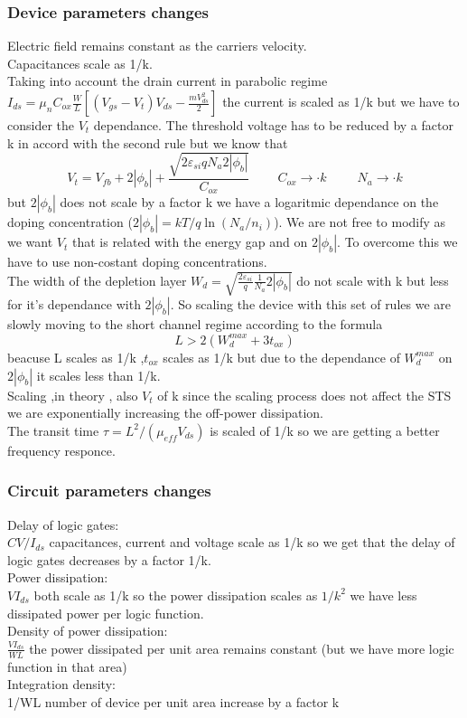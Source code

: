 \subsubsection{Device parameters changes}
Electric field remains constant as the carriers velocity.\\
Capacitances scale as 1/k.\\
Taking into account the drain current in parabolic regime $I_{ds}=\mu_nC_{ox}\frac{W}{L}[(V_{gs}-V_t)V_{ds}-\frac{mV_{ds}^2}{2}]$ the current is scaled as 1/k but we have to consider the $V_t$ dependance. The threshold voltage has to be reduced by a factor k in accord with the second rule but we know that 
\begin{equation}
V_t=V_{fb}+2|\phi_b|+\frac{\sqrt{2\varepsilon_{si}qN_a2|\phi_b|}}{C_{ox}} \ \ \ \ \ \ \ \ \ \ C_{ox}\rightarrow \cdot k \ \ \ \ \ \ \ \ \ \ \ N_a \rightarrow \cdot k
\end{equation}
but $2|\phi_b|$ does not scale by a factor k we have a logaritmic dependance on the doping concentration ($2|\phi_b|=kT/q\ln(N_a/n_i)$). We are not free to modify as we want $V_t$ that is related with the energy gap and on $2|\phi_b|$. To overcome this we have to use non-costant doping concentrations.\\
The width of the depletion layer $W_d=\sqrt{\frac{2\varepsilon_{si}}{q}\frac{1}{N_a}2|\phi_b|}$ do not scale with k but less for it's dependance with $2|\phi_b|$. So scaling the device with this set of rules we are slowly moving to the short channel regime according to the formula 
\begin{equation}
L>2(W_d^{max}+3t_{ox})
\end{equation}
beacuse L scales as 1/k ,$t_{ox}$ scales as 1/k but due to the dependance of $W_{d}^{max}$ on $2|\phi_b|$ it scales less than 1/k.\\
Scaling ,in theory , also $V_t$ of k since the scaling process does not affect the STS we are exponentially increasing the off-power dissipation.\\
The transit time $\tau=L^2/(\mu_{eff}V_{ds})$ is scaled of 1/k so we are getting a better frequency responce.\\

\subsubsection{Circuit parameters changes}
\tab Delay of logic gates:\\
$CV/I_{ds}$ capacitances, current and voltage scale as 1/k so we get that the delay of logic gates decreases by a factor 1/k.\\
\tab Power dissipation:\\
$VI_{ds}$ both scale as 1/k so the power dissipation scales as $1/k^2$ we have less dissipated power per logic function.\\
\tab Density of power dissipation:\\
$\frac{VI_{ds}}{WL}$ the power dissipated per unit area remains constant (but we have more logic function in that area)\\
\tab Integration density:\\
1/WL number of device per unit area increase by a factor k\\

